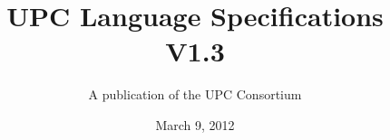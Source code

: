 

\makeindex

\title{UPC Language Specifications\\
V1.3 }

\author{A publication of the UPC Consortium}

\date {March 9, 2012}



\maketitle

\setcounter{page}{2}


\newpage
\setlength {\parskip}{0ex}
\tableofcontents                                             
\setlength {\parskip}{1.3ex}
\newpage








\appendix





\pagebreak
\printindex

